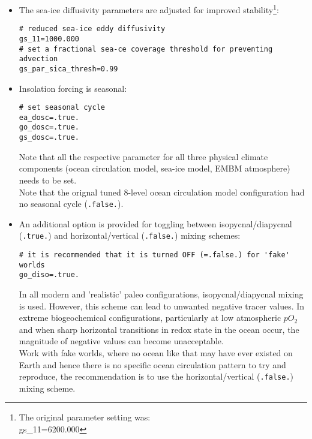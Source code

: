 \documentclass[11pt,fleqn]{book} %
\begin{document}
\begin{itemize}[noitemsep]
\begin{itemize}[noitemsep]
\vspace{1mm}
\item The sea-ice diffusivity parameters are adjusted for improved stability\footnote{The original parameter setting was:
\\gs\_11=6200.000}:
\small\vspace{-2pt}\begin{verbatim}
# reduced sea-ice eddy diffusivity
gs_11=1000.000
# set a fractional sea-ce coverage threshold for preventing advection
gs_par_sica_thresh=0.99
\end{verbatim}\vspace{-2pt}\normalsize
\vspace{1mm}
\item Insolation forcing is seasonal:
\small\vspace{-2pt}\begin{verbatim}
# set seasonal cycle
ea_dosc=.true.
go_dosc=.true.
gs_dosc=.true.
\end{verbatim}\vspace{-2pt}\normalsize
Note that all the respective parameter for all three physical climate components (ocean circulation model, sea-ice model, EMBM atmosphere) needs to be set.
\\Note that the orignal tuned 8-level ocean circulation model configuration had no seasonal cycle (\texttt{.false.}).
\vspace{1mm}
\item An additional option is provided for toggling between isopycnal/diapycnal (\texttt{.true.}) and horizontal/vertical (\texttt{.false.}) mixing schemes:
\small\vspace{-2pt}\begin{verbatim}
# it is recommended that it is turned OFF (=.false.) for 'fake' worlds
go_diso=.true.
\end{verbatim}\vspace{-2pt}\normalsize
In all modern and 'realistic' paleo configurations, isopycnal/diapycnal mixing is used. However, this scheme can lead to unwanted negative tracer values. In extreme biogeochemical configurations, particularly at low atmospheric \(pO_{2}\) and when sharp horizontal transitions in redox state in the ocean occur, the magnitude of negative values can become unacceptable.
\\Work with fake worlds, where no ocean like that may have ever existed on Earth and hence there is no specific ocean circulation pattern to try and reproduce, the recommendation is to use the horizontal/vertical (\texttt{.false.}) mixing scheme.
\end{itemize}
\vspace{1mm}


\end{itemize}
\end{document}
